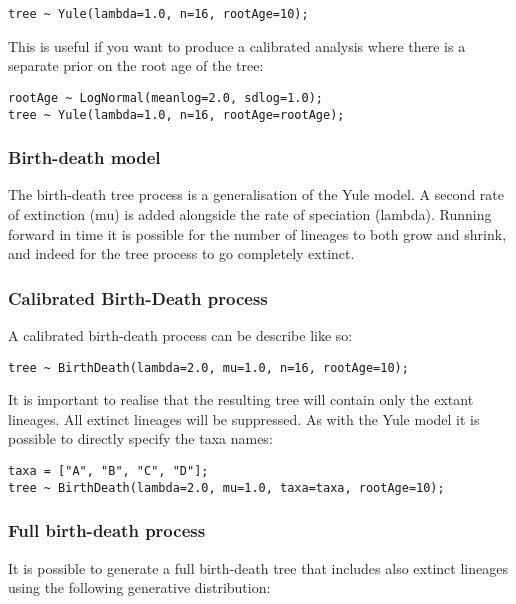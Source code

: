 \documentclass[oneside]{article}
\begin{document}
\begin{verbatim}
tree ~ Yule(lambda=1.0, n=16, rootAge=10);
\end{verbatim}

This is useful if you want to produce a calibrated analysis where there is a separate prior on the root age of the tree:

\begin{verbatim}
rootAge ~ LogNormal(meanlog=2.0, sdlog=1.0);
tree ~ Yule(lambda=1.0, n=16, rootAge=rootAge);
\end{verbatim}

\subsubsection{Birth-death model}

The birth-death tree process is a generalisation of the Yule model. A second rate of extinction (mu) is added alongside
the rate of speciation (lambda). Running forward in time it is possible for the number of lineages to both grow and 
shrink, and indeed for the tree process to go completely extinct. 

\subsubsection{Calibrated Birth-Death process}

A calibrated birth-death process can be describe like so:

\begin{verbatim}
tree ~ BirthDeath(lambda=2.0, mu=1.0, n=16, rootAge=10);
\end{verbatim}

It is important to realise that the resulting tree will contain only the extant lineages. All extinct lineages will be
suppressed. As with the Yule model it is possible to directly specify the taxa names:

\begin{verbatim}
taxa = ["A", "B", "C", "D"];
tree ~ BirthDeath(lambda=2.0, mu=1.0, taxa=taxa, rootAge=10);
\end{verbatim}

\subsubsection{Full birth-death process}

It is possible to generate a full birth-death tree that includes also extinct lineages using the following generative
distribution:
\end{document}
